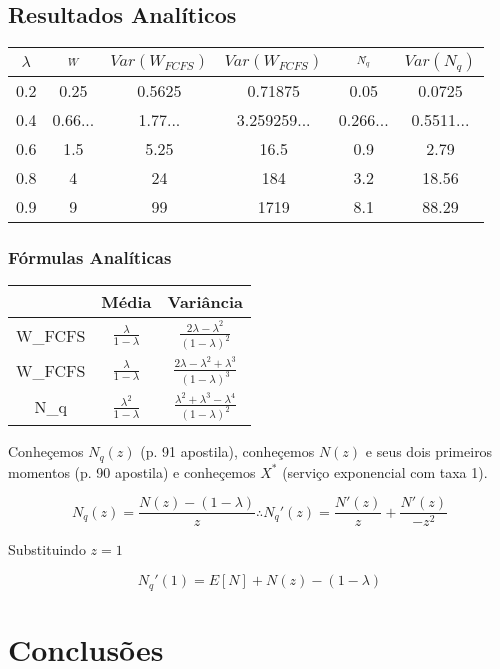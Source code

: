 \documentclass{article}
\newcommand*\barra[2][]{\overline{ #1_{#2} }}
\begin{document}
\subsection{Resultados Analíticos}
\begin{center}
\begin{tabular}{||c c c c c c||} 
 \hline
  $\lambda$ & $\barra{W}$ & $Var(W_{FCFS})$ & $Var(W_{FCFS})$ & $\barra{N_q}$ & $Var(N_{q})$ \\ [0.5ex] 
 \hline
0.2 & 0.25 & 0.5625 & 0.71875 & 0.05 & 0.0725 \\
0.4 & 0.66... & 1.77... & 3.259259... & 0.266... & 0.5511... \\
0.6 & 1.5 & 5.25 & 16.5 & 0.9 & 2.79 \\
0.8 & 4 & 24 & 184 & 3.2 & 18.56 \\
0.9 & 9 & 99 & 1719 & 8.1 & 88.29 \\
 \hline
\end{tabular}
\end{center}

\subsubsection{Fórmulas Analíticas}
\begin{center}
\begin{tabular}{||c c c||} 
 \hline
  & Média & Variância  \\ [0.5ex] 
 \hline
 W_{FCFS} & $\frac{\lambda}{1-\lambda}$ & $\frac{2\lambda-\lambda^2}{(1-\lambda)^2}$  \\ [2ex] 
 W_{FCFS} & $\frac{\lambda}{1-\lambda}$ & $\frac{2\lambda-\lambda^2+\lambda^3}{(1-\lambda)^3}$  \\ [2ex] 
 N_q & $\frac{\lambda^2}{1-\lambda}$ & $\frac{\lambda^2+\lambda^3-\lambda^4}{(1-\lambda)^2}$  \\ [2ex] 
 \hline
\end{tabular}
\end{center}

Conheçemos $N_q(z)$ (p. 91 apostila), conheçemos $N(z)$ e seus dois primeiros momentos (p. 90 apostila) e conheçemos $X^*$ (serviço exponencial com taxa 1). 

\[ N_q(z) = \frac{ N(z) - ( 1 - \lambda ) }{ z } \therefore N_q' (z) = \frac{N'(z)}{z} + \frac{N'(z)}{-z^2}\]

Substituindo $z=1$

\[ N_q' (1) = E[N] + N(z) - (1-\lambda)\]


\section{Conclusões}
\end{document}
